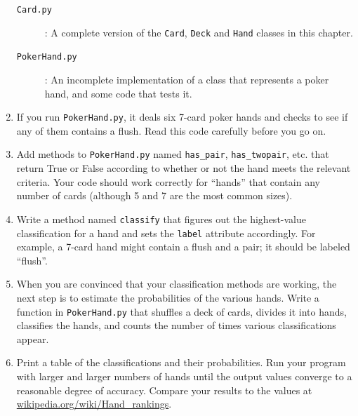 \documentclass[10pt]{book}
\begin{document}
\begin{ex}
\begin{enumerate}
\begin{description}

\item[{\tt Card.py}]: A complete version of the {\tt Card},
{\tt Deck} and {\tt Hand} classes in this chapter.

\item[{\tt PokerHand.py}]: An incomplete implementation of a class
that represents a poker hand, and some code that tests it.

\end{description}
%
\item If you run {\tt PokerHand.py}, it deals six 7-card poker hands
and checks to see if any of them contains a flush.  Read this
code carefully before you go on.

\item Add methods to {\tt PokerHand.py} named \verb"has_pair",
\verb"has_twopair", etc. that return True or False according to
whether or not the hand meets the relevant criteria.  Your code should
work correctly for ``hands'' that contain any number of cards
(although 5 and 7 are the most common sizes).

\item Write a method named {\tt classify} that figures out
the highest-value classification for a hand and sets the
{\tt label} attribute accordingly.  For example, a 7-card hand
might contain a flush and a pair; it should be labeled ``flush''.

\item When you are convinced that your classification methods are
working, the next step is to estimate the probabilities of the various
hands.  Write a function in {\tt PokerHand.py} that shuffles a deck of
cards, divides it into hands, classifies the hands, and counts the
number of times various classifications appear.

\item Print a table of the classifications and their probabilities.
Run your program with larger and larger numbers of hands until the
output values converge to a reasonable degree of accuracy.  Compare
your results to the values at \url{wikipedia.org/wiki/Hand_rankings}.

\end{enumerate}
\end{ex}
\end{document}

